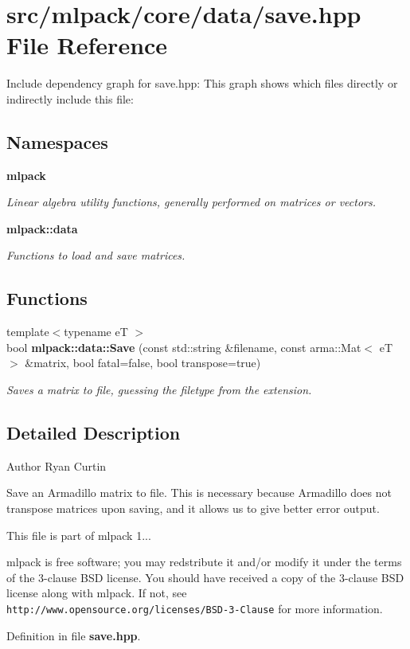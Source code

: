 \section{src/mlpack/core/data/save.hpp File Reference}
\label{save_8hpp}
Include dependency graph for save.\-hpp\-:
This graph shows which files directly or indirectly include this file\-:
\subsection*{Namespaces}
\begin{DoxyCompactItemize}
\item 
{\bf mlpack}
\begin{DoxyCompactList}\small\item\em Linear algebra utility functions, generally performed on matrices or vectors. \end{DoxyCompactList}\item 
{\bf mlpack\-::data}
\begin{DoxyCompactList}\small\item\em Functions to load and save matrices. \end{DoxyCompactList}\end{DoxyCompactItemize}
\subsection*{Functions}
\begin{DoxyCompactItemize}
\item 
{\footnotesize template$<$typename e\-T $>$ }\\bool {\bf mlpack\-::data\-::\-Save} (const std\-::string \&filename, const arma\-::\-Mat$<$ e\-T $>$ \&matrix, bool fatal=false, bool transpose=true)
\begin{DoxyCompactList}\small\item\em Saves a matrix to file, guessing the filetype from the extension. \end{DoxyCompactList}\end{DoxyCompactItemize}


\subsection{Detailed Description}
\begin{DoxyAuthor}{Author}
Ryan Curtin
\end{DoxyAuthor}
Save an Armadillo matrix to file. This is necessary because Armadillo does not transpose matrices upon saving, and it allows us to give better error output.

This file is part of mlpack 1...

mlpack is free software; you may redstribute it and/or modify it under the terms of the 3-\/clause B\-S\-D license. You should have received a copy of the 3-\/clause B\-S\-D license along with mlpack. If not, see {\tt http\-://www.\-opensource.\-org/licenses/\-B\-S\-D-\/3-\/\-Clause} for more information. 

Definition in file {\bf save.\-hpp}.

